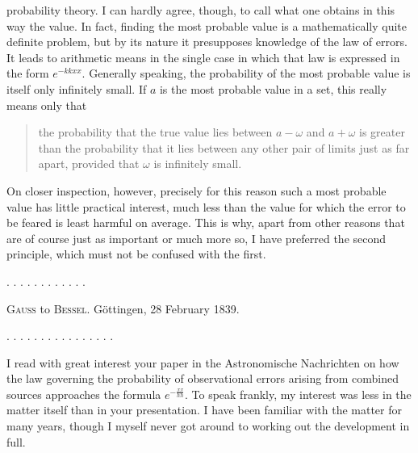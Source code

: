 probability theory. I can hardly agree, though, to call what one obtains in this way the  value. In fact, finding the most probable value is a mathematically quite definite problem, but by its nature it presupposes knowledge of the law of errors. It leads to arithmetic means  in the single case in which that law is expressed in the form $e^{-kkxx}$. Generally speaking, the probability of the most probable value is itself only infinitely small. If $a$ is the most probable value in a  set, this really means only that

\begin{quote}
the probability that the true value lies between $a-\omega$ and $a+\omega$ is greater than the probability that it lies between any other pair of limits just as far apart, provided that $\omega$ is infinitely small.
\end{quote}

On closer inspection, however, precisely for this reason such a most probable value has little practical interest, much less than the value for which the error to be feared is least harmful on average. This is why, apart from other reasons that are of course just as important or much more so, I have preferred the second principle, which must not be confused with the first.

. . . . . . . . . . . .

\begin{center}\textsc{Gauss} to \textsc{Bessel}. Göttingen, 28 February 1839.\end{center}

. . . . . . . . . . . . . . . .

I read with great interest your paper in the Astronomische Nachrichten on how the law governing the probability of observational errors arising from combined sources approaches the formula $e^{-\frac{xx}{hh}}$. To speak frankly, my interest was less in the matter itself than in your presentation. I have been familiar with the matter for many years, though I myself never got around to working out the development in full.

